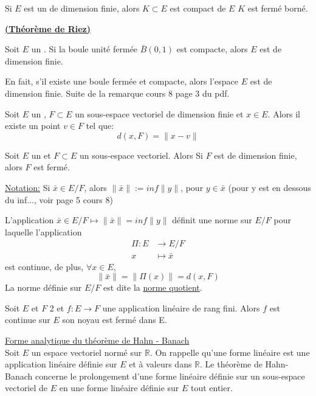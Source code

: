 \documentclass[12pt,a4paper]{article}
\begin{document}
\begin{flushleft}
\begin{thm}
Si $E$ est un \evn de dimension finie, alors $K \subset E$ est compact de $E$ \ssi $K$ est fermé borné.
\end{thm}

\textbf{\underline{(Théorème de Riez)}}
\begin{thm}
Soit $E$ un \evn . Si la boule unité fermée $\bar{B}(0,1)$ est compacte, alors $E$ est de dimension finie.
\end{thm}

\begin{rem}
En fait, s'il existe une boule fermée et compacte, alors l'espace $E$ est de dimension finie. Suite de la remarque cours 8 page 3 du pdf.
\end{rem}


\begin{thm}
Soit $E$ un \evn , $F \subset E$ un sous-espace vectoriel de dimension finie et $x \in E$. Alors il existe un point $v \in F$ tel que: $$d(x,F) = \lVert x - v \rVert$$
\end{thm}


\begin{thm}
Soit $E$ un \evn et $F \subset E$ un sous-espace vectoriel. Alors Si $F$ est de dimension finie, alors $F$ est fermé.
\end{thm}

\underline{Notation:}
Si $\bar{x} \in E/F$, alors $\lVert \bar{x} \rVert := inf \lVert y \rVert$, pour $y \in \bar{x}$ (pour y est en dessous du inf..., voir page 5 cours 8)

\begin{thm}
L'application $\bar{x} \in E/F \mapsto \lVert \bar{x} \rVert = inf \lVert y \rVert$ définit une norme sur $E/F$ pour laquelle l'application
\begin{align*}
\Pi: E &\longrightarrow E/F\\
        x	&\mapsto \bar{x} 
\end{align*}
est continue, de plus, $\forall x  \in E$, $$\lVert \bar{x} \rVert = \lVert \Pi (x) \rVert = d(x,F)$$
La norme définie sur $E/F$ est dite la \underline{norme quotient}.
\end{thm}

\begin{thm}
Soit $E$ et $F$ 2 \evn et $f: E \longrightarrow F$ une application linéaire de rang fini. Alors $f$ est continue sur $E$ \ssi son noyau est fermé dans E.
\end{thm}

\underline{Forme analytique du théorème de Hahn - Banach}\\
Soit $E$ un espace vectoriel normé sur $\mathbb{R}$. On rappelle qu'une forme linéaire est une application linéaire définie sur $E$ et à valeurs dans $\mathbb{R}$. Le théorème de Hahn-Banach concerne le prolongement d'une forme linéaire définie sur un sous-espace vectoriel de $E$ en une forme linéaire définie sur $E$ tout entier.\\


\end{flushleft}
\end{document}
